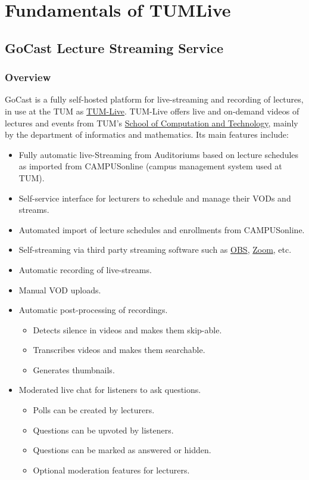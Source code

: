
\chapter{Fundamentals of TUMLive}\label{chapter:fundamentals}

\section{GoCast Lecture Streaming Service}

\subsection{Overview}

GoCast is a fully self-hosted platform for live-streaming and recording of lectures, in use at the \ac{TUM} as \href{https://tum.live}{TUM-Live}.
TUM-Live offers live and on-demand videos of lectures and events from \ac{TUM}'s \href{https://www.cit.tum.de/}{School of Computation and Technology}, mainly by the department of informatics and mathematics. 
Its main features include:

\begin{itemize}
    \item Fully automatic live-Streaming from Auditoriums based on lecture schedules as imported from CAMPUSonline (campus management system used at \ac{TUM}).
    \item Self-service interface for lecturers to schedule and manage their \ac{VOD}s and streams.
    \item Automated import of lecture schedules and enrollments from CAMPUSonline.
    \item Self-streaming via third party streaming software such as \href{https://obsproject.com/}{OBS}, \href{https://zoom.us}{Zoom}, etc.
    \item Automatic recording of live-streams.
    \item Manual \ac{VOD} uploads.
    \item Automatic post-processing of recordings.
    \begin{itemize}
        \item Detects silence in videos and makes them skip-able.
        \item Transcribes videos and makes them searchable.
        \item Generates thumbnails.
    \end{itemize}
    \item Moderated live chat for listeners to ask questions.
    \begin{itemize}
        \item Polls can be created by lecturers.
        \item Questions can be upvoted by listeners.
        \item Questions can be marked as answered or hidden.
        \item Optional moderation features for lecturers.
    \end{itemize}
\end{itemize}

